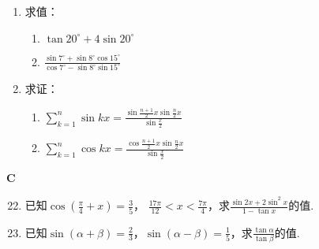 \begin{enumerate}
\item 求值：
\begin{multicols}{2}
\begin{enumerate}[(1)]
    \item $\tan20^{\circ}+4\sin 20^{\circ}$
    \item $\frac{\sin 7^{\circ}+\sin 8^{\circ}\cos15^{\circ}}{\cos7^{\circ}-\sin8^{\circ}\sin15^{\circ}}$
\end{enumerate}
\end{multicols}

\item 求证：
\begin{multicols}{2}
\begin{enumerate}[(1)]
    \item $\sum\limits^n_{k=1}\sin kx=\frac{\sin\frac{n+1}{2}x\sin \frac{n}{2}x}{\sin\frac{x}{2}} $
    \item $\sum\limits^n_{k=1}\cos kx=\frac{\cos\frac{n+1}{2}x\sin \frac{n}{2}x}{\sin\frac{x}{2}} $
\end{enumerate}
\end{multicols}
\end{enumerate}

\begin{center}
    \bfseries C
\end{center}

\begin{enumerate}\setcounter{enumi}{21}
    \item 已知$\cos\left(\frac{\pi}{4}+x\right)=\frac{3}{5}$， $\frac{17\pi}{12}<x<\frac{7\pi}{4}$，求$\frac{\sin 2x+2\sin^2 x}{1-\tan x}$的值.
    \item 已知$\sin(\alpha+\beta)=\frac{2}{3}$，$\sin(\alpha-\beta)=\frac{1}{5}$，求$\frac{\tan\alpha}{\tan\beta}$的值.
\end{enumerate}













